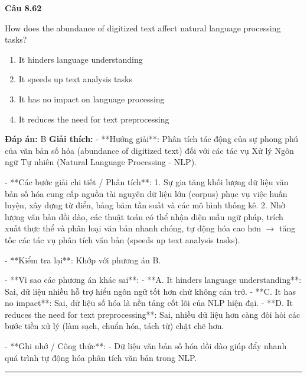\documentclass[11pt,a4paper]{article}
\newenvironment{question}[1]{%
  \par\vspace{1em}\noindent\textbf{\large Câu #1}\par\vspace{0.4em}
}{%
  \par\vspace{1em}\hrule\vspace{0.6em}
}
\newenvironment{choices}{%
  \begin{enumerate}[label=\textbf{\Alph*.},leftmargin=2.2em,itemsep=2pt,topsep=3pt]
}{%
  \end{enumerate}
}
\newcommand{\choice}{\item}
\begin{document}
\begin{question}{8.62}
How does the abundance of digitized text affect natural language processing tasks?
\begin{choices}
\choice It hinders language understanding
\choice It speeds up text analysis tasks
\choice It has no impact on language processing
\choice It reduces the need for text preprocessing
\end{choices}
\textbf{Đáp án:} B
\textbf{Giải thích:} - **Hướng giải**:
  Phân tích tác động của sự phong phú của văn bản số hóa (abundance of digitized text) đối với các tác vụ Xử lý Ngôn ngữ Tự nhiên (Natural Language Processing - NLP).

- **Các bước giải chi tiết / Phân tích**:
  1. Sự gia tăng khối lượng dữ liệu văn bản số hóa cung cấp nguồn tài nguyên dữ liệu lớn (corpus) phục vụ việc huấn luyện, xây dựng từ điển, bảng băm tần suất và các mô hình thống kê.
  2. Nhờ lượng văn bản dồi dào, các thuật toán có thể nhận diện mẫu ngữ pháp, trích xuất thực thể và phân loại văn bản nhanh chóng, tự động hóa cao hơn \(\rightarrow\) tăng tốc các tác vụ phân tích văn bản (speeds up text analysis tasks).

- **Kiểm tra lại**:
  Khớp với phương án B.

- **Vì sao các phương án khác sai**:
  - **A. It hinders language understanding**: Sai, dữ liệu nhiều hỗ trợ hiểu ngôn ngữ tốt hơn chứ không cản trở.
  - **C. It has no impact**: Sai, dữ liệu số hóa là nền tảng cốt lõi của NLP hiện đại.
  - **D. It reduces the need for text preprocessing**: Sai, nhiều dữ liệu hơn càng đòi hỏi các bước tiền xử lý (làm sạch, chuẩn hóa, tách từ) chặt chẽ hơn.

- **Ghi nhớ / Công thức**:
  - Dữ liệu văn bản số hóa dồi dào giúp đẩy nhanh quá trình tự động hóa phân tích văn bản trong NLP.
\end{question}
\end{document}
